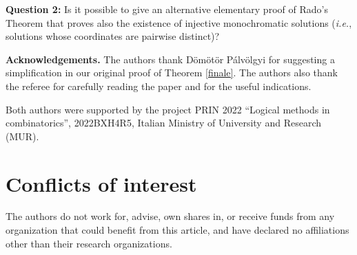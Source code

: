 \documentclass[a4paper,oneside]{article}
\theoremstyle{definition}
\theoremstyle{named}
\begin{document}
\medskip
{\bfseries Question 2:} 
Is it possible to give an alternative elementary proof of Rado's Theorem that proves also the 
existence of injective monochromatic solutions
(\emph{i.e.}, solutions whose coordinates are pairwise distinct)?

\bigskip
\noindent
\textbf{Acknowledgements.}
The authors thank D\"om\"ot\"or P\'alv\"olgyi for suggesting a simplification
in our original proof of Theorem \ref{finale}.
The authors also thank the referee for carefully reading the paper
and for the useful indications.

Both authors  were supported by the project PRIN 2022 ``Logical methods
in combinatorics'', 2022BXH4R5, Italian Ministry of University and Research (MUR).


\section*{Conflicts of interest}

The authors do not work for, advise, own shares in, or receive funds from any organization
that could benefit from this article, and have declared no affiliations other than their research
organizations.
\end{document}
